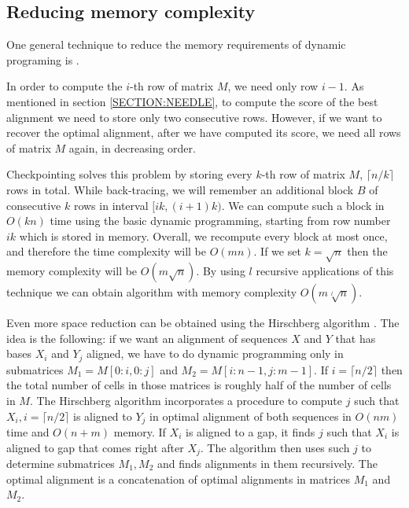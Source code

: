 \begin{comment}
Time complexity and memory requirements of the stepping-stone algorithm are of
order of $O(\sqrt{|X|^2+|Y|^2})$ under the assumption that the maximum area between
two anchors is independent of the sequence length \cite{Meyer2002}.
\end{comment}

\subsection{Reducing memory complexity}
\begin{comment}
Checkpointing is a general technique in dynamic programming, which allows reduce
the number of rows of the dynamic programming matrix to $O(\sqrt n)$ while
doubling the running time
\cite{Grice1997}. 
\end{comment}
One general technique to reduce the memory requirements of dynamic programing is  \cite{Grice1997}.

In order to compute the $i$-th row of matrix $M$, we need only row $i-1$. As
mentioned in section \ref{SECTION:NEEDLE}, to compute the score of the best
alignment we need to store only
two consecutive rows.  However, if we want to
recover the optimal alignment, after we have computed its score, we need all
rows of matrix $M$ again, in decreasing order.

Checkpointing solves this problem by storing every $k$-th row of matrix $M$,
$\lceil n/k\rceil$ rows in total.  While back-tracing, we will remember an
additional block $B$ of consecutive $k$ rows in interval $[ik,(i+1)k)$. We can
compute such a block in $O(kn)$ time using the basic dynamic programming,
starting from row number $ik$ which is stored in memory.  Overall, we recompute
every block at most once, and therefore the time complexity will be $O(mn)$.
If we set $k=\sqrt n$ then the memory complexity will be $O(m\sqrt n)$. By
using $l$ recursive applications of this technique we can obtain algorithm with
memory complexity $O(m\sqrt[l]{ n})$.

Even more space reduction can be obtained using the Hirschberg algorithm \cite{Hirschberg1975}. The idea is
the following: if we want an alignment of sequences $X$ and $Y$ that has bases $X_i$
and $Y_j$ aligned, we have to  do dynamic programming only in submatrices
$M_1=M[0:i,0:j]$ and $M_2=M[i:n-1,j:m-1]$. If $i=\lceil n/2\rceil$ then
the total number of cells in those matrices is roughly half of the number of
cells in $M$. The Hirschberg algorithm incorporates a procedure to compute 
$j$ such that $X_i, i=\lceil n/2\rceil$ is aligned to $Y_j$ in optimal alignment of both sequences in $O(nm)$
time and $O(n+m)$ memory. If $X_i$ is aligned to a gap, it finds $j$ such
that $X_i$ is aligned to gap that comes right after $X_j$.
The algorithm then uses such $j$ to determine submatrices $M_1,M_2$ and finds alignments in them recursively.
The optimal alignment is a concatenation of optimal alignments in matrices $M_1$ and
$M_2$.

